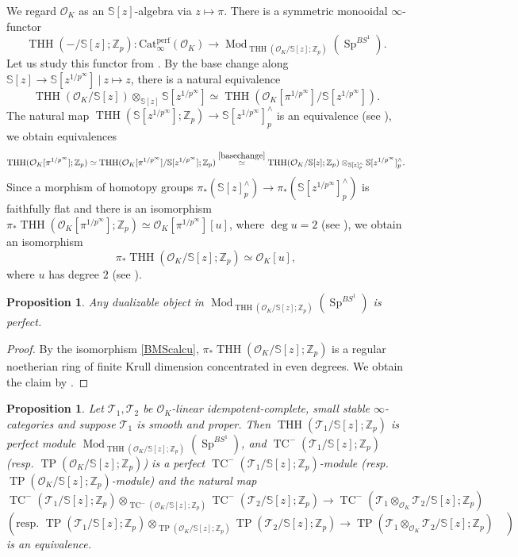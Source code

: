 \documentclass[11pt]{amsart}
\newcommand{\Z}{\mathbb{Z}}
\newcommand{\sO}{\mathcal{O}}
\newcommand{\sT}{\mathcal{T}}
\newcommand{\bS}{\mathbb{S}}
\newcommand{\Mod}{\operatorname{Mod}}
\newcommand{\THH}{\operatorname{THH}}
\newcommand{\TP}{\operatorname{TP}}
\newcommand{\TCn}{\operatorname{TC}^{-}}
\newcommand{\Cat}{\operatorname{Cat_{\infty}^{perf}}}
\newcommand{\Sp}{\operatorname{Sp}}
\newtheorem{prop}[lemma]{Proposition}
\theoremstyle{definition}
\theoremstyle{remark}
\numberwithin{equation}{section}
\begin{document}
We regard $\sO_K$ as an $\bS [z]$-algebra via $z\mapsto \pi$. There is a symmetric monooidal $\infty$-functor
\[
\THH(-/\bS[z];\Z_p):\Cat (\sO_K) \to \Mod_{\THH(\sO_K/\bS[z];\Z_p)}(\Sp^{BS^1}).
\]
Let us study this functor from \cite[section 11]{BMS2}. By the base change along $\bS[z] \to \bS[z^{1/{p^\infty}}]~|~z\mapsto z$, there is a natural equivalence
\begin{equation}\label{basechange}
\THH(\sO_K/\bS[z]) \otimes_{\bS[z]} \bS[z^{1/{p^\infty}}] \simeq \THH(\sO_K[\pi^{1/p^{\infty}}]/\bS[z^{1/{p^\infty}}]).
\end{equation}
The natural map $\THH(\bS[z^{1/{p^{\infty}}}];\Z_p) \to \bS[z^{1/{p^{\infty}}}]^{\wedge}_p$ is an equivalence (see \cite[Proposition. 11.7]{BMS2}), we obtain equivalences
\begin{equation}
\THH(\sO_K[\pi^{1/p^{\infty}}];\Z_p) \simeq \THH(\sO_K[\pi^{1/p^{\infty}}]/\bS[z^{1/{p^\infty}}];\Z_p) \overset{\eqref{basechange}}{\simeq}\THH(\sO_K/\bS[z];\Z_p) \otimes_{\bS[z]^{\wedge}_p} \bS[z^{1/{p^\infty}}]^{\wedge}_p.
\end{equation}
Since a morphism of homotopy groups $\pi_*(\bS[z]^{\wedge}_p) \to \pi_*(\bS[z^{1/{p^\infty}}]^{\wedge}_p)$ is faithfully flat and there is an isomorphism
$\pi_*\THH(\sO_K[\pi^{1/p^{\infty}}];\Z_p) \simeq \sO_K[\pi^{1/p^{\infty}}][u]$, where $\deg u=2$ (see \cite[section. 6]{BMS2}), we obtain an isomorphism
\begin{equation}\label{BMScalcu}
\pi_*\THH(\sO_K/\bS[z];\Z_p) \simeq \sO_K[u],
\end{equation}
where $u$ has degree $2$ (see \cite[Proposition. 11.10]{BMS2}).
\begin{prop}\label{propdualisperf}
Any dualizable object in $\Mod_{\THH(\sO_K/\bS[z];\Z_p)}(\Sp^{BS^1})$ is perfect.
\end{prop}
\begin{proof}
By the isomorphism \eqref{BMScalcu}, $\pi_*\THH(\sO_K/\bS[z];\Z_p)$ is a regular noetherian ring of finite Krull dimension concentrated in even degrees. We obtain the claim by \cite[Theorem 2.15]{KunnethTP}.
\end{proof}
\begin{prop}\label{TPTCkunneth}
Let $\sT_1,\sT_2$ be $\sO_K$-linear idempotent-complete, small stable $\infty$-categories and suppose $\sT_1$ is smooth and proper. Then $\THH(\sT_1/\bS[z];\Z_p)$ is perfect module $\Mod_{\THH(\sO_K/\bS[z];\Z_p)}(\Sp^{BS^1})$, and $\TCn(\sT_1/\bS[z];\Z_p)$ (resp. $\TP(\sO_K/\bS[z];\Z_p)$) is a perfect $\TCn(\sT_1/\bS[z];\Z_p)$-module (resp. $\TP(\sO_K/\bS[z];\Z_p)$-module) and the natural map
\[
\TCn(\sT_1/\bS[z];\Z_p) \otimes_{\TCn(\sO_K/\bS[z];\Z_p)}\TCn(\sT_2/\bS[z];\Z_p) \to \TCn(\sT_1\otimes_{\sO_K}\sT_2/\bS[z];\Z_p)
\]
\[
(\text{resp. }\TP(\sT_1/\bS[z];\Z_p) \otimes_{\TP(\sO_K/\bS[z];\Z_p)}\TP(\sT_2/\bS[z];\Z_p) \to \TP(\sT_1\otimes_{\sO_K}\sT_2/\bS[z];\Z_p) \quad )
\]
is an equivalence.
\end{prop}
\end{document}
